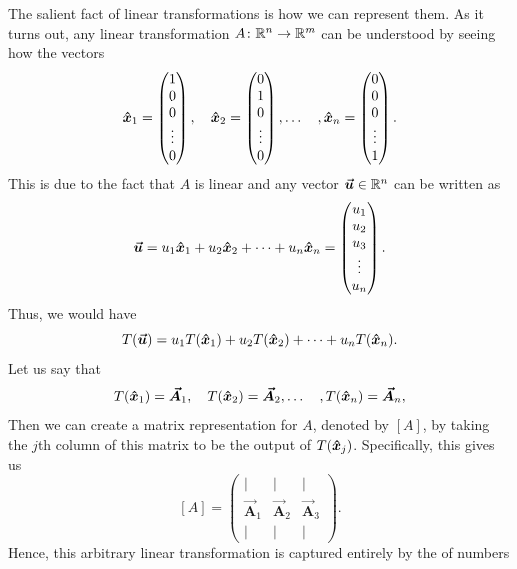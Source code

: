         The salient fact of linear transformations is how we can represent them.  As it turns out, any linear transformation $A\colon \mathbb{R}^n \to \mathbb{R}^m$ can be understood by seeing how the vectors 
        \[
            \boldsymbol{\hat{x}}_1 = \begin{pmatrix} 1 \\ 0 \\ 0 \\ \vdots \\ 0 \end{pmatrix}, \quad \boldsymbol{\hat{x}}_2 = \begin{pmatrix} 0 \\ 1 \\ 0 \\ \vdots \\ 0 \end{pmatrix}, \dots\quad, \boldsymbol{\hat{x}}_n = \begin{pmatrix} 0 \\ 0 \\ 0 \\ \vdots \\ 1 \end{pmatrix}.
        \]
        This is due to the fact that $A$ is linear and any vector $\boldsymbol{\boldsymbol{\vec{u}}} \in \mathbb{R}^n$ can be written as
        \[
            \boldsymbol{\boldsymbol{\vec{u}}} = u_1 \boldsymbol{\hat{x}}_1 + u_2 \boldsymbol{\hat{x}}_2 + \cdots + u_n \boldsymbol{\hat{x}}_n = \begin{pmatrix} u_1 \\ u_2 \\ u_3 \\ \vdots \\ u_n \end{pmatrix}.
        \]
        Thus, we would have
        \[
            T(\boldsymbol{\boldsymbol{\vec{u}}}) = u_1 T(\boldsymbol{\hat{x}}_1) + u_2 T(\boldsymbol{\hat{x}}_2) + \cdots + u_n T(\boldsymbol{\hat{x}}_n).
        \]
        Let us say that
        \[
            T(\boldsymbol{\hat{x}}_1) = \boldsymbol{\vec{A}}_1, \quad T(\boldsymbol{\hat{x}}_2) = \boldsymbol{\vec{A}}_2, \dots \quad, T(\boldsymbol{\hat{x}}_n)=\boldsymbol{\vec{A}}_n,
        \]
        Then we can create a matrix representation for $A$, denoted by $[A]$, by taking the $j$th column of this matrix to be the output of $T(\boldsymbol{\hat{x}}_j)$.  Specifically, this gives us
        \[
            [A] = \begin{pmatrix} \vert & \vert & \vert \\ \boldsymbol{\vec{A}}_1 & \boldsymbol{\vec{A}}_2 & \boldsymbol{\vec{A}}_3 \\ \vert & \vert & \vert \end{pmatrix}.
        \]
        Hence, this arbitrary linear transformation is captured entirely by the  of numbers
